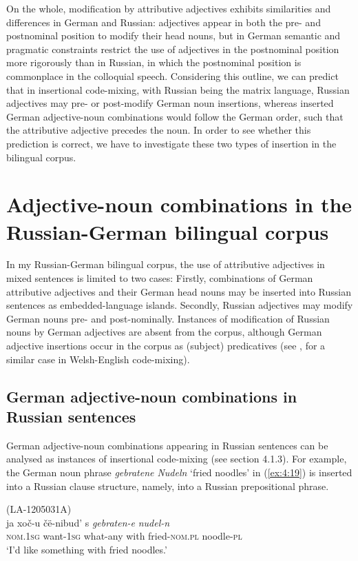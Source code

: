 On the whole, modification by attributive adjectives exhibits similarities and differences in German and Russian: adjectives appear in both the pre- and postnominal position to modify their head nouns, but in German semantic and pragmatic constraints restrict the use of adjectives in the postnominal position more rigorously than in Russian, in which the postnominal position is commonplace in the colloquial speech. Considering this outline, we can predict that in insertional code-mixing, with Russian being the matrix language, Russian adjectives may pre- or post-modify German noun insertions, whereas inserted German adjective-noun combinations would follow the German order, such that the attributive adjective precedes the noun. In order to see whether this prediction is correct, we have to investigate these two types of insertion in the bilingual corpus.

\section{Adjective-noun combinations in the Russian-German bilingual corpus}\label{sec:AN corpus}
In my Russian-German bilingual corpus, the use of attributive adjectives in mixed sentences is limited to two cases: Firstly, combinations of German attributive adjectives and their German head nouns may be inserted into Russian sentences as embedded-language islands. Secondly, Russian adjectives may modify German nouns pre- and post-nominally. Instances of modification of Russian nouns by German adjectives are absent from the corpus, although German adjective insertions occur in the corpus as (subject) predicatives (see \citealt{deuchar-congruence-2005}, for a similar case in Welsh-English code-mixing).

\subsection{German adjective-noun combinations in Russian sentences}
German adjective-noun combinations appearing in Russian sentences can be analysed as instances of insertional code-mixing (see section 4.1.3). For example, the German noun phrase \textit{gebratene Nudeln} `fried noodles' in (\ref{ex:4:19}) is inserted into a Russian clause structure, namely, into a Russian prepositional phrase. 

\ea
\label{ex:4:19}
(LA-1205031A)\\
\gll ja xoč-u čë-nibud' s \textit{gebraten-e} \textit{nudel-n}\\ 
 \textsc{nom.1sg} want-\textsc{1sg} what-any with fried-\textsc{nom.pl} noodle-\textsc{pl}\\
\glt `I'd like something with fried noodles.'
\z

